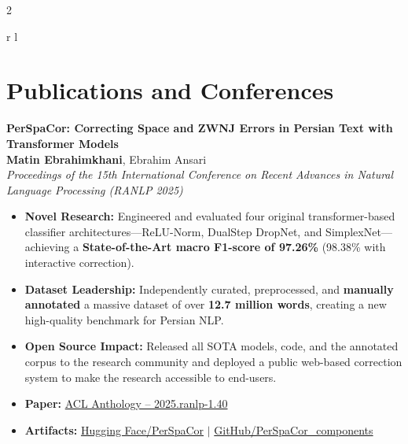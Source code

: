 \documentclass[
	8pt, %
]{FreemanCV}
\begin{document}
\begin{paracol}{2}
\begin{supertabular}{r l}
\end{supertabular}
\medskip %


\section{Publications and Conferences}

\textbf{PerSpaCor: Correcting Space and ZWNJ Errors in Persian Text with Transformer Models} \\
\textbf{Matin Ebrahimkhani}, Ebrahim Ansari\\
\textit{Proceedings of the 15th International Conference on Recent Advances in Natural Language Processing (RANLP 2025)} \\

\begin{itemize}
    \item \textbf{Novel Research:} Engineered and evaluated four original transformer-based classifier architectures—ReLU-Norm, DualStep DropNet, and SimplexNet—achieving a \textbf{State-of-the-Art macro F1-score of 97.26\%} (98.38\% with interactive correction).
    \item \textbf{Dataset Leadership:} Independently curated, preprocessed, and \textbf{manually annotated} a massive dataset of over \textbf{12.7 million words}, creating a new high-quality benchmark for Persian NLP.
    \item \textbf{Open Source Impact:} Released all SOTA models, code, and the annotated corpus to the research community and deployed a public web-based correction system to make the research accessible to end-users.
    \item \textbf{Paper:} \href{https://aclanthology.org/2025.ranlp-1.40/}{ACL Anthology -- 2025.ranlp-1.40}
    \item \textbf{Artifacts:} \href{https://huggingface.co/PerSpaCor}{Hugging Face/PerSpaCor} $|$ \href{https://github.com/MatinEbrahimkhani/PerSpaCor_components}{GitHub/PerSpaCor\_components}
\end{itemize}

\vspace{7em}


\end{paracol}
\end{document}
